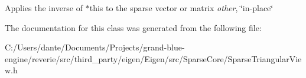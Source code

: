 Applies the inverse of {\ttfamily $\ast$this} to the sparse vector or matrix {\itshape other}, \char`\"{}in-\/place\char`\"{} 

The documentation for this class was generated from the following file\+:\begin{DoxyCompactItemize}
\item 
C\+:/\+Users/dante/\+Documents/\+Projects/grand-\/blue-\/engine/reverie/src/third\+\_\+party/eigen/\+Eigen/src/\+Sparse\+Core/Sparse\+Triangular\+View.\+h\end{DoxyCompactItemize}

